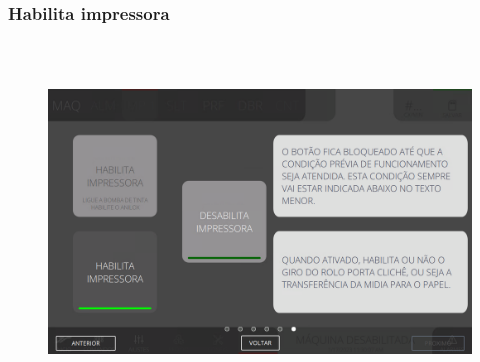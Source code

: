 \newpage
\thispagestyle{fancy}
\vspace*{40 pt}
\subsubsection{\small{Habilita impressora}} \label{telaComandoImpressoraHabilitaImpressora}
\vspace*{\fill}
\begin{figure}[h]
  \centering
  \includegraphics[width=576px,height=360px]{src/imagesFlexo/04-printter/02-printter/commands/e-6.png}
\end{figure}
\vspace*{\fill}